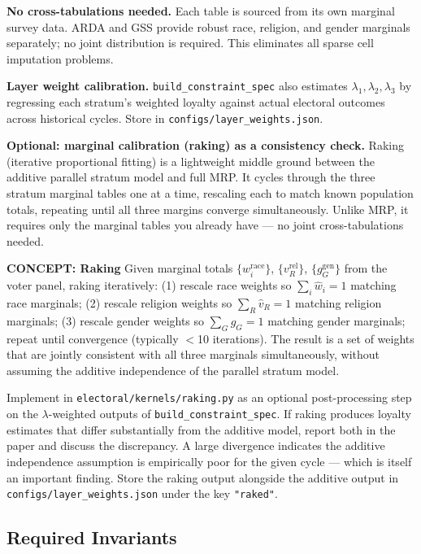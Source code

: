 \documentclass[11pt]{article}
\begin{document}
\noindent\textbf{No cross-tabulations needed.} Each table is sourced from its own
marginal survey data. ARDA and GSS provide robust race, religion, and gender marginals
separately; no joint distribution is required. This eliminates all sparse cell
imputation problems.

\noindent\textbf{Layer weight calibration.} \texttt{build\_constraint\_spec} also
estimates $\lambda_1, \lambda_2, \lambda_3$ by regressing each stratum's weighted
loyalty against actual electoral outcomes across historical cycles. Store in
\texttt{configs/layer\_weights.json}.

\medskip
\noindent\textbf{Optional: marginal calibration (raking) as a consistency check.}
Raking (iterative proportional fitting) is a lightweight middle ground between the
additive parallel stratum model and full MRP. It cycles through the three stratum
marginal tables one at a time, rescaling each to match known population totals,
repeating until all three margins converge simultaneously. Unlike MRP, it requires
only the marginal tables you already have --- no joint cross-tabulations needed.

\begin{mdframed}[style=conceptbox]
\textbf{CONCEPT: Raking}
Given marginal totals $\{w_i^{\text{race}}\}$, $\{v_R^{\text{rel}}\}$,
$\{g_G^{\text{gen}}\}$ from the voter panel, raking iteratively:
(1) rescale race weights so $\sum_i \hat{w}_i = 1$ matching race marginals;
(2) rescale religion weights so $\sum_R \hat{v}_R = 1$ matching religion marginals;
(3) rescale gender weights so $\sum_G \hat{g}_G = 1$ matching gender marginals;
repeat until convergence (typically $<$10 iterations). The result is a set of
weights that are jointly consistent with all three marginals simultaneously, without
assuming the additive independence of the parallel stratum model.
\end{mdframed}

Implement in \texttt{electoral/kernels/raking.py} as an optional post-processing
step on the $\lambda$-weighted outputs of \texttt{build\_constraint\_spec}. If
raking produces loyalty estimates that differ substantially from the additive model,
report both in the paper and discuss the discrepancy. A large divergence indicates
the additive independence assumption is empirically poor for the given cycle ---
which is itself an important finding. Store the raking output alongside the additive
output in \texttt{configs/layer\_weights.json} under the key \texttt{"raked"}.

\subsection*{Required Invariants}
\end{document}

